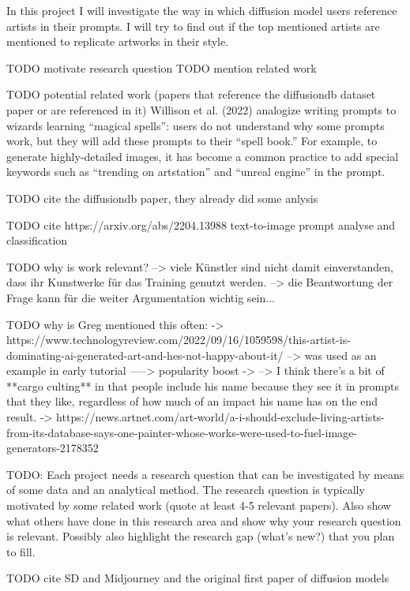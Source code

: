 In this project I will investigate the way in which diffusion model users reference artists in their prompts. I will try to find out if the top mentioned artists are mentioned to replicate artworks in their style. %



TODO motivate research question
TODO mention related work

TODO potential related work (papers that reference the diffusiondb dataset paper or are referenced in it)
Willison et al. (2022) analogize writing prompts to wizards learning “magical spells”: users do not understand why some prompts work, but they will add these prompts to their “spell book.” For example, to generate highly-detailed images, it has become a common practice to add special keywords such as “trending on artstation” and “unreal engine” in the prompt.

TODO cite the diffusiondb paper, they already did some anlysis

TODO cite https://arxiv.org/abs/2204.13988 text-to-image prompt analyse and classification

TODO why is work relevant? 
--> viele Künstler sind nicht damit einverstanden, dass ihr Kunstwerke für das Training genutzt werden.
--> die Beantwortung der Frage kann für die weiter Argumentation wichtig sein...  

TODO why is Greg mentioned this often:
-> https://www.technologyreview.com/2022/09/16/1059598/this-artist-is-dominating-ai-generated-art-and-hes-not-happy-about-it/
--> was used as an example in early tutorial %
-----> popularity boost
-> %
--> I think there's a bit of **cargo culting** in that people include his name because they see it in prompts that they like, regardless of how much of an impact his name has on the end result.
-> https://news.artnet.com/art-world/a-i-should-exclude-living-artists-from-its-database-says-one-painter-whose-works-were-used-to-fuel-image-generators-2178352

TODO:
Each project needs a research question that can be
investigated by means of some data and an analytical
method. The research question is typically motivated by
some related work (quote at least 4-5 relevant papers).
Also show what others have done in this research area
and show why your research question is relevant. Possibly
also highlight the research gap (what’s new?) that you plan
to fill.


TODO cite SD and Midjourney and the original first paper of diffusion models

